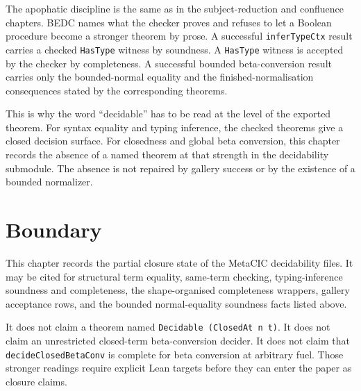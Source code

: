 The apophatic discipline is the same as in the subject-reduction and
confluence chapters. BEDC names what the checker proves and refuses to let a
Boolean procedure become a stronger theorem by prose. A successful
\texttt{inferTypeCtx} result carries a checked \texttt{HasType} witness by
soundness. A \texttt{HasType} witness is accepted by the checker by
completeness. A successful bounded beta-conversion result carries only the
bounded-normal equality and the finished-normalisation consequences stated by
the corresponding theorems.

This is why the word ``decidable'' has to be read at the level of the
exported theorem. For syntax equality and typing inference, the checked
theorems give a closed decision surface. For closedness and global beta
conversion, this chapter records the absence of a named theorem at that
strength in the decidability submodule. The absence is not repaired by
gallery success or by the existence of a bounded normalizer.

\section{Boundary}
\label{sec:metacic-decidable-audit-map-boundary}

This chapter records the partial closure state of the MetaCIC decidability
files. It may be cited for structural term equality, same-term checking,
typing-inference soundness and completeness, the shape-organised completeness
wrappers, gallery acceptance rows, and the bounded normal-equality soundness
facts listed above.

It does not claim a theorem named \texttt{Decidable (ClosedAt n t)}. It does
not claim an unrestricted closed-term beta-conversion decider. It does not
claim that \texttt{decideClosedBetaConv} is complete for beta conversion at
arbitrary fuel. Those stronger readings require explicit Lean targets before
they can enter the paper as closure claims.

